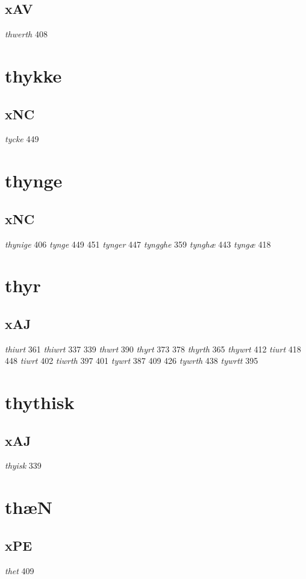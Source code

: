 \documentclass[a4paper,twocolumn]{article}
\begin{document}
\subsection{xAV}
\label{sec:orge4a267c}
\emph{thwerth} 408 
\section{thykke}
\label{sec:org71f96ef}
\subsection{xNC}
\label{sec:org11f0328}
\emph{tycke} 449 
\section{thynge}
\label{sec:org444e16d}
\subsection{xNC}
\label{sec:orgd1bccde}
\emph{thynige} 406 \emph{tynge} 449 451 \emph{tynger} 447 \emph{tyngghe} 359 \emph{tynghæ} 443 \emph{tyngæ} 418 
\section{thyr}
\label{sec:org833ade7}
\subsection{xAJ}
\label{sec:org2c48b9f}
\emph{thiurt} 361 \emph{thiwrt} 337 339 \emph{thwrt} 390 \emph{thyrt} 373 378 \emph{thyrth} 365 \emph{thywrt} 412 \emph{tiurt} 418 448 \emph{tiwrt} 402 \emph{tiwrth} 397 401 \emph{tywrt} 387 409 426 \emph{tywrth} 438 \emph{tywrtt} 395 
\section{thythisk}
\label{sec:org2cef298}
\subsection{xAJ}
\label{sec:org16f2e2e}
\emph{thyisk} 339 
\section{thæN}
\label{sec:orgc5548e7}
\subsection{xPE}
\label{sec:orgc796d52}
\emph{thet} 409 
\end{document}
